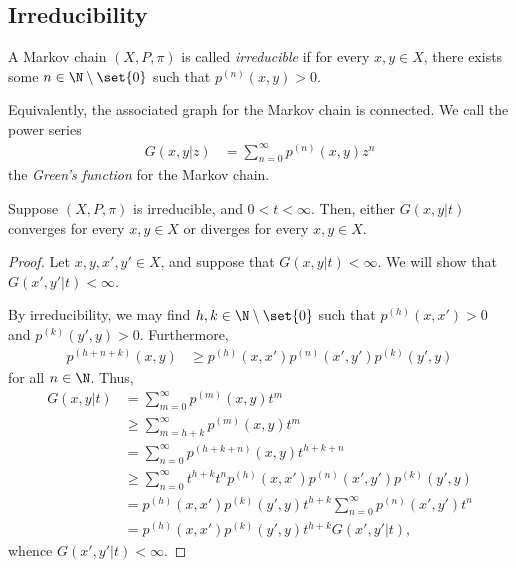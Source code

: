 \documentclass[10pt]{mypackage}
\begin{document}
\subsection{Irreducibility}%
\begin{definition}
  A Markov chain $\left( X,P,\pi \right)$ is called \textit{irreducible} if for every $x,y\in X$, there exists some $n\in \N\setminus \set{0}$ such that $p^{(n)}\left( x,y \right) > 0$.
\end{definition}
Equivalently, the associated graph for the Markov chain is connected. We call the power series
\begin{align*}
  G\left( x,y|z \right) &= \sum_{n=0}^{\infty} p^{(n)}\left( x,y \right)z^{n}
\end{align*}
the \textit{Green's function} for the Markov chain.
\begin{proposition}
  Suppose $\left( X,P,\pi \right)$ is irreducible, and $0 < t < \infty$. Then, either $G\left( x,y|t \right)$ converges for every $x,y\in X$ or diverges for every $x,y\in X$.
\end{proposition}
\begin{proof}
  Let $x,y,x',y'\in X$, and suppose that $G\left( x,y|t \right) < \infty$. We will show that $G\left( x',y'|t \right) < \infty$.

  By irreducibility, we may find $h,k\in \N\setminus \set{0}$ such that $p^{(h)}\left( x,x' \right) > 0$ and $p^{(k)}\left( y',y \right) > 0$. Furthermore,
  \begin{align*}
    p^{(h + n + k)}\left( x,y \right) &\geq p^{(h)}\left( x,x' \right) p^{(n)}\left( x',y' \right) p^{(k)}\left( y',y \right)
  \end{align*}
  for all $n\in \N$. Thus,
  \begin{align*}
    G\left( x,y|t \right) &= \sum_{m=0}^{\infty}p^{(m)}\left( x,y \right)t^{m}\\
                          &\geq \sum_{m=h+k}^{\infty}p^{(m)}\left( x,y \right)t^{m}\\
                          &= \sum_{n=0}^{\infty} p^{(h + k + n)}\left( x,y \right)t^{h + k + n}\\
                          &\geq \sum_{n=0}^{\infty} t^{h+k}t^{n}p^{(h)}\left( x,x' \right)p^{(n)}\left( x',y' \right)p^{(k)}\left( y',y \right)\\
                          &= p^{(h)}\left( x,x' \right)p^{(k)}\left( y',y \right)t^{h+k}\sum_{n=0}^{\infty}p^{(n)}\left( x',y' \right)t^{n}\\
                          &= p^{(h)}\left( x,x' \right)p^{(k)}\left( y',y \right)t^{h+k}G\left( x',y'|t \right),
  \end{align*}
  whence $G\left( x',y'|t \right) < \infty$.
\end{proof}
\end{document}

